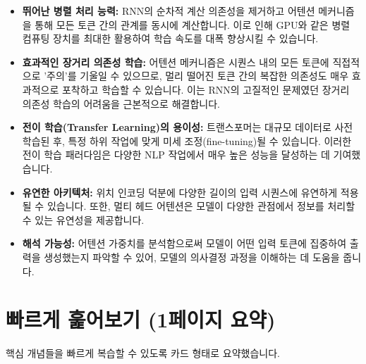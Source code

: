 \documentclass[11pt,a4paper]{article}
\begin{document}
\begin{summarybox}[title={트랜스포머의 주요 장점}]
\begin{itemize}
    \item \textbf{뛰어난 병렬 처리 능력:} RNN의 순차적 계산 의존성을 제거하고 어텐션 메커니즘을 통해 모든 토큰 간의 관계를 동시에 계산합니다. 이로 인해 GPU와 같은 병렬 컴퓨팅 장치를 최대한 활용하여 학습 속도를 대폭 향상시킬 수 있습니다.
    \item \textbf{효과적인 장거리 의존성 학습:} 어텐션 메커니즘은 시퀀스 내의 모든 토큰에 직접적으로 '주의'를 기울일 수 있으므로, 멀리 떨어진 토큰 간의 복잡한 의존성도 매우 효과적으로 포착하고 학습할 수 있습니다. 이는 RNN의 고질적인 문제였던 장거리 의존성 학습의 어려움을 근본적으로 해결합니다.
    \item \textbf{전이 학습(Transfer Learning)의 용이성:} 트랜스포머는 대규모 데이터로 사전 학습된 후, 특정 하위 작업에 맞게 미세 조정(fine-tuning)될 수 있습니다. 이러한 전이 학습 패러다임은 다양한 NLP 작업에서 매우 높은 성능을 달성하는 데 기여했습니다.
    \item \textbf{유연한 아키텍처:} 위치 인코딩 덕분에 다양한 길이의 입력 시퀀스에 유연하게 적용될 수 있습니다. 또한, 멀티 헤드 어텐션은 모델이 다양한 관점에서 정보를 처리할 수 있는 유연성을 제공합니다.
    \item \textbf{해석 가능성:} 어텐션 가중치를 분석함으로써 모델이 어떤 입력 토큰에 집중하여 출력을 생성했는지 파악할 수 있어, 모델의 의사결정 과정을 이해하는 데 도움을 줍니다.
\end{itemize}
\end{summarybox}

\newpage
\section{빠르게 훑어보기 (1페이지 요약)}
핵심 개념들을 빠르게 복습할 수 있도록 카드 형태로 요약했습니다.
\end{document}
